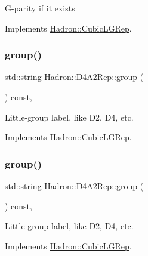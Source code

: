 G-\/parity if it exists 

Implements \mbox{\hyperlink{structHadron_1_1CubicLGRep_ace26f7b2d55e3a668a14cb9026da5231}{Hadron\+::\+Cubic\+L\+G\+Rep}}.

\mbox{\label{structHadron_1_1D4A2Rep_a4f1794198aaae635c3f2fa3816c36942}} 
\subsubsection{\texorpdfstring{group()}{group()}\hspace{0.1cm}{\footnotesize\ttfamily [1/3]}}
{\footnotesize\ttfamily std\+::string Hadron\+::\+D4\+A2\+Rep\+::group (\begin{DoxyParamCaption}{ }\end{DoxyParamCaption}) const\hspace{0.3cm}{\ttfamily [inline]}, {\ttfamily [virtual]}}

Little-\/group label, like D2, D4, etc. 

Implements \mbox{\hyperlink{structHadron_1_1CubicLGRep_a9bdb14b519a611d21379ed96a3a9eb41}{Hadron\+::\+Cubic\+L\+G\+Rep}}.

\mbox{\label{structHadron_1_1D4A2Rep_a4f1794198aaae635c3f2fa3816c36942}} 
\subsubsection{\texorpdfstring{group()}{group()}\hspace{0.1cm}{\footnotesize\ttfamily [2/3]}}
{\footnotesize\ttfamily std\+::string Hadron\+::\+D4\+A2\+Rep\+::group (\begin{DoxyParamCaption}{ }\end{DoxyParamCaption}) const\hspace{0.3cm}{\ttfamily [inline]}, {\ttfamily [virtual]}}

Little-\/group label, like D2, D4, etc. 

Implements \mbox{\hyperlink{structHadron_1_1CubicLGRep_a9bdb14b519a611d21379ed96a3a9eb41}{Hadron\+::\+Cubic\+L\+G\+Rep}}.

\mbox{\label{structHadron_1_1D4A2Rep_a4f1794198aaae635c3f2fa3816c36942}} 
